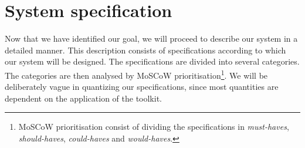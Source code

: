\documentclass[a4paper, openany, oneside]{memoir}
\begin{document}




\section{System specification}
\label{sec:theory-specs}
Now that we have identified our goal, we will proceed to describe our system in a detailed manner. This description consists of specifications according to which our system will be designed. The specifications are divided into several categories. The categories are then analysed by MoSCoW prioritisation\footnote{MoSCoW prioritisation consist of dividing the specifications in \textit{must-haves}, \textit{should-haves}, \textit{could-haves} and \textit{would-haves}.}. We will be deliberately vague in quantizing our specifications, since most quantities are dependent on the application of the toolkit.
\end{document}
